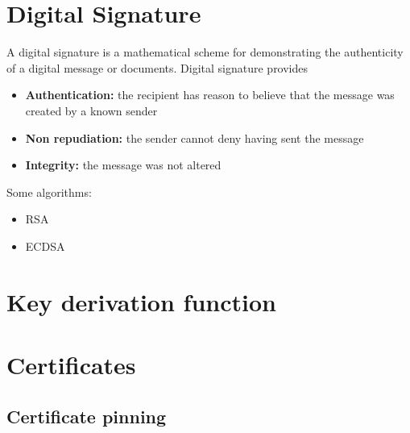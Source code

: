 \documentclass[10pt,a4paper]{article}
\begin{document}
\section{Digital Signature}
A digital signature is a mathematical scheme for demonstrating the authenticity of a digital message or documents. Digital signature provides
\begin{itemize}
\item {\bf Authentication:} the recipient has reason to believe that the message was created by a known sender
\item {\bf Non repudiation:} the sender cannot deny having sent the message
\item {\bf Integrity:} the message was not altered
\end{itemize}
Some algorithms:
\begin{itemize}
\item RSA
\item ECDSA
\end{itemize}
\section{Key derivation function}
\section{Certificates}
\subsection{Certificate pinning}
\end{document}
